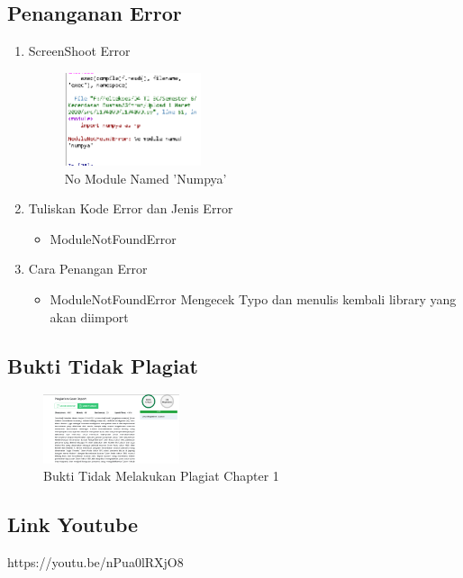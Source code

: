 \subsection{Penanganan Error}
\begin{enumerate}
	\item ScreenShoot Error
	\begin{figure}[H]
		\includegraphics[width=4cm]{figures/1174079/1/error.png}
		\centering
		\caption{No Module Named 'Numpya'}
	\end{figure}

	\item Tuliskan Kode Error dan Jenis Error
	\begin{itemize}
		\item ModuleNotFoundError
	\end{itemize}
	\item Cara Penangan Error
	\begin{itemize}
		\item ModuleNotFoundError
		\hfill\break
		Mengecek Typo dan menulis kembali library yang akan diimport
	\end{itemize}
\end{enumerate}

\subsection{Bukti Tidak Plagiat}
\begin{figure}[H]
	\includegraphics[width=4cm]{figures/1174079/1/plagiarism.png}
	\centering
	\caption{Bukti Tidak Melakukan Plagiat Chapter 1}
\end{figure}

\subsection{Link Youtube}
https://youtu.be/nPua0lRXjO8
